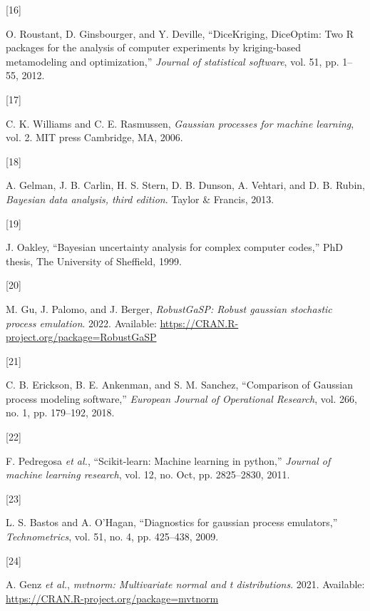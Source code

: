 \documentclass[
  12pt,
  a4paper,
  twoside]{book}
\newlength{\cslhangindent}
\newlength{\csllabelwidth}
\newlength{\cslentryspacingunit} %
\newenvironment{CSLReferences}[2] %
 {%
  \setlength{\parindent}{0pt}
  \ifodd #1
  \let\oldpar\par
  \def\par{\hangindent=\cslhangindent\oldpar}
  \fi
  \setlength{\parskip}{#2\cslentryspacingunit}
 }%
 {}
\newcommand{\CSLLeftMargin}[1]{\parbox[t]{\csllabelwidth}{#1}}
\newcommand{\CSLRightInline}[1]{\parbox[t]{\linewidth - \csllabelwidth}{#1}\break}
\begin{document}
\begin{CSLReferences}{0}{0}
\leavevmode{}%
\CSLLeftMargin{{[}16{]} }
\CSLRightInline{O. Roustant, D. Ginsbourger, and Y. Deville, {``{DiceKriging, DiceOptim: Two R packages for the analysis of computer experiments by kriging-based metamodeling and optimization},''} \emph{Journal of statistical software}, vol. 51, pp. 1--55, 2012.}

\leavevmode{}%
\CSLLeftMargin{{[}17{]} }
\CSLRightInline{C. K. Williams and C. E. Rasmussen, \emph{Gaussian processes for machine learning}, vol. 2. MIT press Cambridge, MA, 2006.}

\leavevmode{}%
\CSLLeftMargin{{[}18{]} }
\CSLRightInline{A. Gelman, J. B. Carlin, H. S. Stern, D. B. Dunson, A. Vehtari, and D. B. Rubin, \emph{Bayesian data analysis, third edition}. Taylor \& Francis, 2013.}

\leavevmode{}%
\CSLLeftMargin{{[}19{]} }
\CSLRightInline{J. Oakley, {``Bayesian uncertainty analysis for complex computer codes,''} PhD thesis, The University of Sheffield, 1999.}

\leavevmode{}%
\CSLLeftMargin{{[}20{]} }
\CSLRightInline{M. Gu, J. Palomo, and J. Berger, \emph{RobustGaSP: Robust gaussian stochastic process emulation}. 2022. Available: \url{https://CRAN.R-project.org/package=RobustGaSP}}

\leavevmode{}%
\CSLLeftMargin{{[}21{]} }
\CSLRightInline{C. B. Erickson, B. E. Ankenman, and S. M. Sanchez, {``{Comparison of Gaussian process modeling software},''} \emph{European Journal of Operational Research}, vol. 266, no. 1, pp. 179--192, 2018.}

\leavevmode{}%
\CSLLeftMargin{{[}22{]} }
\CSLRightInline{F. Pedregosa \emph{et al.}, {``Scikit-learn: Machine learning in python,''} \emph{Journal of machine learning research}, vol. 12, no. Oct, pp. 2825--2830, 2011.}

\leavevmode{}%
\CSLLeftMargin{{[}23{]} }
\CSLRightInline{L. S. Bastos and A. O'Hagan, {``Diagnostics for gaussian process emulators,''} \emph{Technometrics}, vol. 51, no. 4, pp. 425--438, 2009.}

\leavevmode{}%
\CSLLeftMargin{{[}24{]} }
\CSLRightInline{A. Genz \emph{et al.}, \emph{{mvtnorm}: Multivariate normal and t distributions}. 2021. Available: \url{https://CRAN.R-project.org/package=mvtnorm}}

\end{CSLReferences}
\end{document}
